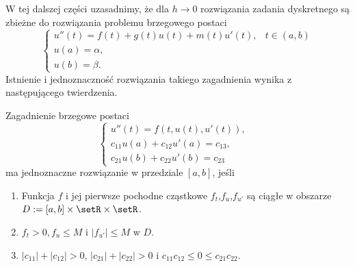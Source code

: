 W tej dalszej części uzasadnimy, że dla $h \to 0$ rozwiązania zadania dyskretnego są zbieżne do rozwiązania problemu brzegowego postaci
\begin{equation}\label{zagad_brzeg_zbiez}
\left\{\begin{array}{cl}
u''(t) = f(t) + g(t) u(t) + m(t) u'(t), &  t \in (a,b)\\
u(a) = \alpha, & \\
u(b) = \beta.
\end{array}\right.
\end{equation}
Istnienie i jednoznaczność rozwiązania takiego zagadnienia wynika z następującego twierdzenia.
\begin{theorem}
Zagadnienie brzegowe postaci
\begin{equation}
\left\{\begin{array}{cl}
u''(t) = f(t,u(t),u'(t)), & \\
c_{11}u(a) + c_{12}u'(a) = c_{13}, & \\
c_{21}u(b) + c_{22}u'(b) = c_{23}
\end{array}\right.
\end{equation}
ma jednoznaczne rozwiązanie w przedziale $[a,b]$, jeśli
\begin{enumerate}
\item Funkcja $f$ i jej pierwsze pochodne cząstkowe $f_t$,$f_u$,$f_{u'}$ są ciągłe w obszarze $D:= [a,b] \times \setR \times \setR$.
\item $f_t >0, f_u \leq M$ i $|f_{u'}| \leq M$ w $D$.
\item $|c_{11}| + |c_{12}| > 0$, $|c_{21}| + |c_{22}| >0$ i $c_{11}c_{12}\leq 0 \leq c_{21}c_{22}$.
\end{enumerate}
\end{theorem}
